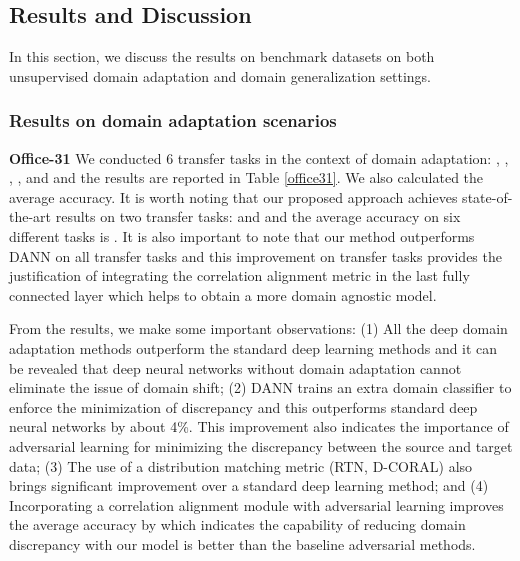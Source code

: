 \documentclass[review]{elsarticle}
\begin{document}
\subsection{Results and Discussion}

In this section, we discuss the results on benchmark datasets on both unsupervised domain adaptation and domain generalization settings.

\subsubsection{Results on domain adaptation scenarios }


\textbf{Office-31} We conducted 6 transfer tasks in the context of domain adaptation: , , , ,  and  and the results are reported in Table \ref{office31}. We also calculated the average accuracy. It is worth noting that our proposed approach achieves state-of-the-art results on two transfer tasks:  and  and the average accuracy on six different tasks is . It is also important to note that our method outperforms DANN on all transfer tasks and this improvement on transfer tasks provides the justification of integrating the correlation alignment metric in the last fully connected layer which helps to obtain a more domain agnostic model. 

From the results, we make some important observations: (1) All the deep domain adaptation methods outperform the standard deep learning methods and it can be revealed that deep neural networks without domain adaptation cannot eliminate the issue of domain shift; (2) DANN trains an extra domain classifier to enforce the minimization of discrepancy and this outperforms standard deep neural networks by about 4\%. This improvement also indicates the importance of adversarial learning for minimizing the discrepancy between the source and target data; (3) The use of a distribution matching metric (RTN, D-CORAL) also brings significant improvement over a standard deep learning method; and (4) Incorporating a correlation alignment module with adversarial learning improves the average accuracy by  which indicates the capability of reducing domain discrepancy with our model is better than the baseline adversarial methods.
\end{document}
